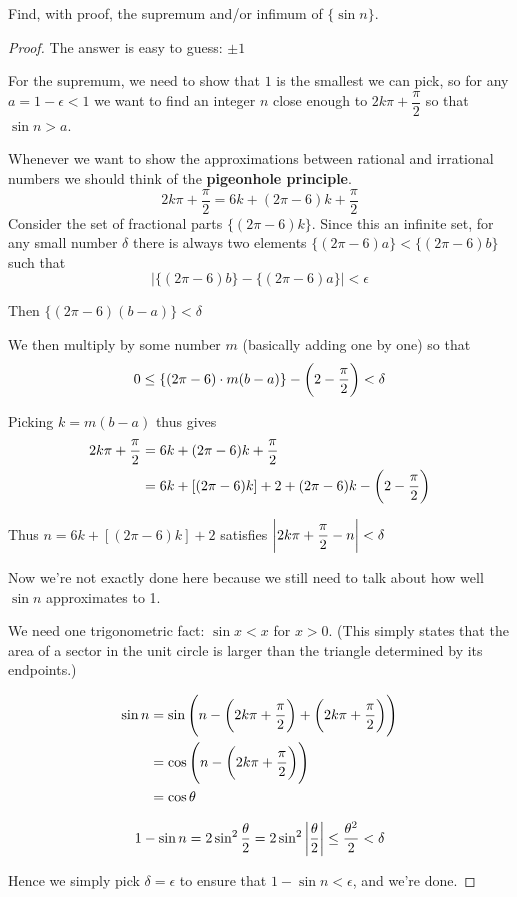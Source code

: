 \begin{prbm}
Find, with proof, the supremum and/or infimum of $\{\sin n\}$.
\end{prbm}

\begin{proof}
The answer is easy to guess: $\pm1$

For the supremum, we need to show that $1$ is the smallest we can pick, so for any $a=1-\epsilon<1$ we want to find an integer $n$ close enough to $2k\pi+\dfrac{\pi}{2}$ so that $\sin n > a$.

Whenever we want to show the approximations between rational and irrational numbers we should think of the \textbf{pigeonhole principle}.
\[ 2k\pi+\frac{\pi}{2}=6k+(2\pi-6)k+\frac{\pi}{2} \]
Consider the set of fractional parts $\{(2\pi-6)k\}$. Since this an infinite set, for any small number $\delta$ there is always two elements $\{(2\pi-6)a\}<\{(2\pi-6)b\}$ such that
\[ |\{(2\pi-6)b\}-\{(2\pi-6)a\}|<\epsilon \]

Then $\{(2\pi-6)(b-a)\}<\delta$

We then multiply by some number $m$ (basically adding one by one) so that
\[ 0 \le \{(2\pi-6)\cdot m(b-a)\}-\left(2-\frac{\pi}{2}\right)<\delta \]

Picking $k=m(b-a)$ thus gives
\begin{align*}
2k\pi+\frac{\pi}{2} &= 6k+(2\pi-6)k+\frac{\pi}{2} \\
&= 6k+[(2\pi-6)k]+2+{(2\pi-6)k}-\left(2-\frac{\pi}{2}\right)
\end{align*}

Thus $n=6k+[(2\pi-6)k]+2$ satisfies $\left|2k\pi+\dfrac{\pi}{2}-n\right|<\delta$

Now we're not exactly done here because we still need to talk about how well $\sin n$ approximates to 1.

We need one trigonometric fact: $\sin x<x$ for $x>0$. (This simply states that the area of a sector in the unit circle is larger than the triangle determined by its endpoints.)

\begin{align*}
\sin n&=\sin\left(n-\left(2k\pi+\frac{\pi}{2}\right)+\left(2k\pi+\frac{\pi}{2}\right)\right) \\
&=\cos\left(n-\left(2k\pi+\frac{\pi}{2}\right)\right) \\
&=\cos\theta
\end{align*}

\[ 1 - \sin n = 2 \sin^2 \frac{\theta}{2} = 2 \sin^2 \left|\frac{\theta}{2}\right| \le \frac{\theta^2}{2}<\delta \]

Hence we simply pick $\delta=\epsilon$ to ensure that $1 - \sin n<\epsilon$, and we're done.
\end{proof}

